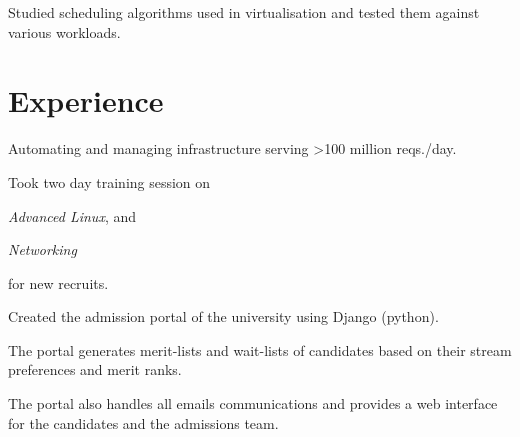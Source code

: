 \documentclass[]{deedy}
\begin{document}
\begin{minipage}[t]{0.66\textwidth}
\begin{tightemize}
\item Studied scheduling algorithms used in virtualisation and tested them against various workloads.
\end{tightemize}

\section{Experience}
\begin{tightemize}
\item Automating and managing infrastructure serving >100 million reqs./day.
\item Took two day training session on 
\begin{enumerate*}[label=(\roman*)]
  \item \textit{Advanced Linux}, and
  \item \textit{Networking}
\end{enumerate*}
 for new recruits.
\end{tightemize}
\sectionsep

\sectionsep

\begin{tightemize}
\item Created the admission portal of the university using Django (python).
\item The portal generates merit-lists and wait-lists of candidates based on their stream preferences and merit ranks. 
\item The portal also handles all emails communications and provides a web interface for the candidates and the admissions team.
\end{tightemize}
\sectionsep


\end{minipage}
\end{document}

